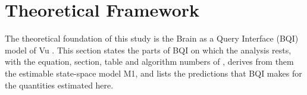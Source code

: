 \section{Theoretical Framework}
\label{sec:theory}
The theoretical foundation of this study is the Brain as a Query Interface (BQI) model of Vu \cite{BQI}. This section states the parts of BQI on which the analysis rests, with the equation, section, table and algorithm numbers of \cite{BQI}, derives from them the estimable state-space model M1, and lists the predictions that BQI makes for the quantities estimated here.

